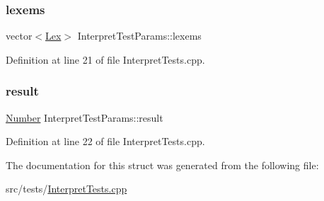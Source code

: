 \subsubsection{\texorpdfstring{lexems}{lexems}}
{\footnotesize\ttfamily vector$<$\hyperlink{classteam22_1_1_calc_1_1_lex}{Lex}$>$ Interpret\+Test\+Params\+::lexems}



Definition at line 21 of file Interpret\+Tests.\+cpp.

\mbox{\label{struct_interpret_test_params_a47453b7066c4a8ffa209157af91e7ae7}} 
\subsubsection{\texorpdfstring{result}{result}}
{\footnotesize\ttfamily \hyperlink{classteam22_1_1_math_1_1_number}{Number} Interpret\+Test\+Params\+::result}



Definition at line 22 of file Interpret\+Tests.\+cpp.



The documentation for this struct was generated from the following file\+:\begin{DoxyCompactItemize}
\item 
src/tests/\hyperlink{_interpret_tests_8cpp}{Interpret\+Tests.\+cpp}\end{DoxyCompactItemize}
